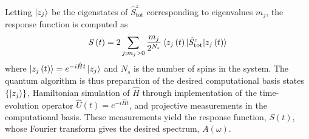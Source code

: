 \documentclass[prx,aps,twocolumn,showpacs,superscriptaddress,10pt]{revtex4-1}
\begin{document}
Letting $\ket{z_{j}}$ be the eigenstates
of $\hat{S}_{\text{tot}}^{z}$ corresponding to eigenvalues $m_{j}$,
the response function is computed as
\begin{equation}\label{eq:ResponseFunc}
S\left(t\right)=2\sum_{j;m_{j}>0}\frac{m_{j}}{2^{N_{s}}}\braket{z_{j}\left(t\right)|\hat{S}_{\text{tot}}^{z}|z_{j}\left(t\right)}
\end{equation}
where $\ket{z_{j}\left(t\right)}=e^{-i\hat{H}t}\ket{z_{j}}$ and $N_{s}$
is the number of spins in the system. The quantum algorithm is
thus preparation of the desired computational basis states $\left\{ \ket{z_{j}}\right\} $,
Hamiltonian simulation of $\hat{H}$ through implementation of the
time-evolution operator $\hat{U}\left(t\right)=e^{-i\hat{H}t}$, and
projective measurements in the computational basis. These measurements yield the response function, $S\left(t\right)$, whose Fourier transform gives the desired spectrum, $A\left(\omega\right)$.
\end{document}
